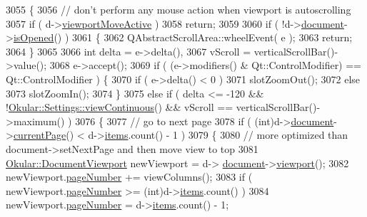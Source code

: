 \begin{DoxyCode}
3055 \{
3056     \textcolor{comment}{// don't perform any mouse action when viewport is autoscrolling}
3057     \textcolor{keywordflow}{if} ( d->\hyperlink{classPageViewPrivate_acc47dfc95cad4f126c4dbd3e8f31e43b}{viewportMoveActive} )
3058         \textcolor{keywordflow}{return};
3059 
3060     \textcolor{keywordflow}{if} ( !d->\hyperlink{classPageViewPrivate_a50645b9853306cffd74e51efb677e5b4}{document}->\hyperlink{classOkular_1_1Document_a909ad69d556a6525e194a28c7fbf643a}{isOpened}() )
3061     \{
3062         QAbstractScrollArea::wheelEvent( e );
3063         \textcolor{keywordflow}{return};
3064     \}
3065 
3066     \textcolor{keywordtype}{int} delta = e->delta(),
3067         vScroll = verticalScrollBar()->value();
3068     e->accept();
3069     \textcolor{keywordflow}{if} ( (e->modifiers() & Qt::ControlModifier) == Qt::ControlModifier ) \{
3070         \textcolor{keywordflow}{if} ( e->delta() < 0 )
3071             slotZoomOut();
3072         \textcolor{keywordflow}{else}
3073             slotZoomIn();
3074     \}
3075     \textcolor{keywordflow}{else} \textcolor{keywordflow}{if} ( delta <= -120 && !\hyperlink{classOkular_1_1Settings_a6f16a784dc815b9192ce24d054e3f82b}{Okular::Settings::viewContinuous}() && 
      vScroll == verticalScrollBar()->maximum() )
3076     \{
3077         \textcolor{comment}{// go to next page}
3078         \textcolor{keywordflow}{if} ( (\textcolor{keywordtype}{int})d->\hyperlink{classPageViewPrivate_a50645b9853306cffd74e51efb677e5b4}{document}->\hyperlink{classOkular_1_1Document_a42ec374d73794bf56d7e7b11f1f56319}{currentPage}() < d->\hyperlink{classPageViewPrivate_ad90c795dead9abfaa5818a94e00435bc}{items}.count() - 1 )
3079         \{
3080             \textcolor{comment}{// more optimized than document->setNextPage and then move view to top}
3081             \hyperlink{classOkular_1_1DocumentViewport}{Okular::DocumentViewport} newViewport = d->
      \hyperlink{classPageViewPrivate_a50645b9853306cffd74e51efb677e5b4}{document}->\hyperlink{classOkular_1_1Document_abb8738de0a53aa4a9f552de0e1e749f8}{viewport}();
3082             newViewport.\hyperlink{classOkular_1_1DocumentViewport_a122674d4a493e79b1aa5fd5c00e81c93}{pageNumber} += viewColumns();
3083             \textcolor{keywordflow}{if} ( newViewport.\hyperlink{classOkular_1_1DocumentViewport_a122674d4a493e79b1aa5fd5c00e81c93}{pageNumber} >= (\textcolor{keywordtype}{int})d->\hyperlink{classPageViewPrivate_ad90c795dead9abfaa5818a94e00435bc}{items}.count() )
3084                 newViewport.\hyperlink{classOkular_1_1DocumentViewport_a122674d4a493e79b1aa5fd5c00e81c93}{pageNumber} = d->\hyperlink{classPageViewPrivate_ad90c795dead9abfaa5818a94e00435bc}{items}.count() - 1;

\end{DoxyCode}
